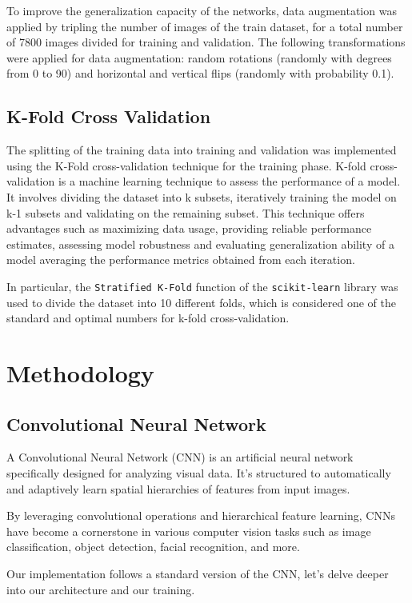 \documentclass[11pt]{article}
\begin{document}
\begin{multicols*}{2}
To improve the generalization capacity of the networks, data augmentation was applied by tripling the number of images of the train dataset, for a total number of 7800 images divided for training and validation.
The following transformations were applied for data augmentation: random rotations (randomly with degrees from 0 to 90) and horizontal and vertical flips (randomly with probability 0.1).


\subsection{K-Fold Cross Validation}
The splitting of the training data into training and validation was implemented using the K-Fold cross-validation technique for the training phase. 
K-fold cross-validation is a machine learning technique to assess the performance of a model. It involves dividing the dataset into k subsets, iteratively training the model on k-1 subsets and validating on the remaining subset. This technique offers advantages such as maximizing data usage, providing reliable performance estimates, assessing model robustness and evaluating generalization ability of a model averaging the performance metrics obtained from each iteration.

In particular, the \texttt{Stratified K-Fold} function of the \texttt{scikit-learn} library was used to divide the dataset into 10 different folds, which is considered one of the standard and optimal numbers for k-fold cross-validation.

\section{Methodology}
\subsection{Convolutional Neural Network}

A Convolutional Neural Network (CNN) is an artificial neural network specifically designed for analyzing visual data. It's structured to automatically and adaptively learn spatial hierarchies of features from input images.

By leveraging convolutional operations and hierarchical feature learning, CNNs have become a cornerstone in various computer vision tasks such as image classification, object detection, facial recognition, and more.

Our implementation follows a standard version of the CNN, let's delve deeper into our architecture and our training.


\end{multicols*}
\end{document}

